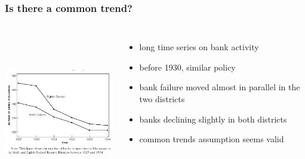 \documentclass{beamer}
\begin{document}
\begin{frame}
\frametitle{Is there a common trend?}

 \begin{columns}
\includegraphics[width=6cm,height=7cm,keepaspectratio]{Figure 5.2} 

\begin{itemize}
	\item long time series on bank activity
	\item before 1930, similar policy
	\item bank failure moved almost in parallel in the two districts
	\item banks declining slightly in both districts
	\item common trends assumption seems valid

\end{itemize}

\end{columns}

\end{frame}

\end{document}
